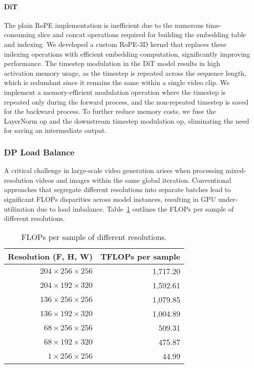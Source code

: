\paragraph{DiT} 
The plain RoPE implementation is inefficient due to the numerous time-consuming slice and concat operations required for building the embedding table and indexing. We developed a custom RoPE-3D kernel that replaces these indexing operations with efficient embedding computation, significantly improving performance.
The timestep modulation in the DiT model results in high activation memory usage, as the timestep is repeated across the sequence length, which is redundant since it remains the same within a single video clip. We implement a memory-efficient modulation operation where the timestep is repeated only during the forward process, and the non-repeated timestep is saved for the backward process. To further reduce memory costs, we fuse the LayerNorm op and the downstream timestep modulation op, eliminating the need for saving an intermediate output. 


\subsubsection{DP Load Balance}
A critical challenge in large-scale video generation arises when processing mixed-resolution videos and images within the same global iteration.
Conventional approaches that segregate different resolutions into separate batches lead to significant FLOPs disparities across model instances, resulting in GPU under-utilization due to load imbalance.
Table~\ref{tab:vid_img_flops} outlines the FLOPs per sample of different resolutions.

\begin{table}[h]
\centering
\begin{tabular}{rr}
\toprule
Resolution (F, H, W) & TFLOPs per sample \\
\midrule
$ 204 \times 256 \times 256$ & 1,717.20 \\
$ 204 \times 192 \times 320$ & 1,592.61 \\
$ 136 \times 256 \times 256$ & 1,079.85 \\
$ 136 \times 192 \times 320$ & 1,004.89 \\
$  68 \times 256 \times 256$ &  509.31 \\
$  68 \times 192 \times 320$ &  475.87 \\
$   1 \times 256 \times 256$ &   44.99 \\
\bottomrule
\end{tabular}
\vspace{3mm}
\caption{FLOPs per sample of different resolutions.}
\label{tab:vid_img_flops}
\end{table}

